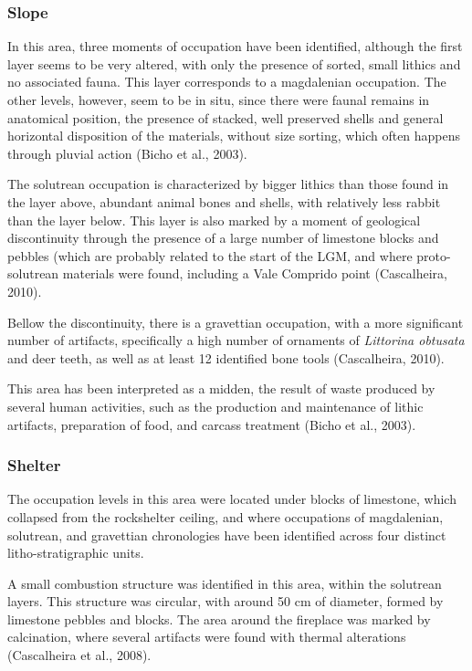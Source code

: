 \documentclass[12pt,twoside]{reedthesis}
\begin{document}
\hypertarget{slope}{%
\subsubsection{Slope}\label{slope}}

In this area, three moments of occupation have been identified, although the first layer seems to be very altered, with only the presence of sorted, small lithics and no associated fauna. This layer corresponds to a magdalenian occupation. The other levels, however, seem to be in situ, since there were faunal remains in anatomical position, the presence of stacked, well preserved shells and general horizontal disposition of the materials, without size sorting, which often happens through pluvial action (Bicho et al., 2003).

The solutrean occupation is characterized by bigger lithics than those found in the layer above, abundant animal bones and shells, with relatively less rabbit than the layer below. This layer is also marked by a moment of geological discontinuity through the presence of a large number of limestone blocks and pebbles (which are probably related to the start of the LGM, and where proto-solutrean materials were found, including a Vale Comprido point (Cascalheira, 2010).

Bellow the discontinuity, there is a gravettian occupation, with a more significant number of artifacts, specifically a high number of ornaments of \emph{Littorina obtusata} and deer teeth, as well as at least 12 identified bone tools (Cascalheira, 2010).

This area has been interpreted as a midden, the result of waste produced by several human activities, such as the production and maintenance of lithic artifacts, preparation of food, and carcass treatment (Bicho et al., 2003).

\hypertarget{shelter}{%
\subsubsection{Shelter}\label{shelter}}

The occupation levels in this area were located under blocks of limestone, which collapsed from the rockshelter ceiling, and where occupations of magdalenian, solutrean, and gravettian chronologies have been identified across four distinct litho-stratigraphic units.

A small combustion structure was identified in this area, within the solutrean layers. This structure was circular, with around 50 cm of diameter, formed by limestone pebbles and blocks. The area around the fireplace was marked by calcination, where several artifacts were found with thermal alterations (Cascalheira et al., 2008).
\end{document}
